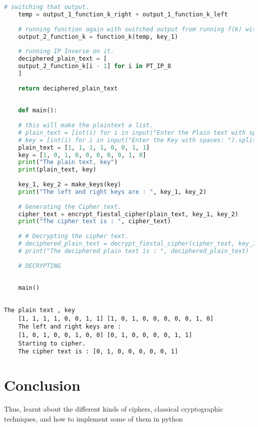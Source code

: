 \documentclass{article}
\begin{document}
\begin{lstlisting}[language=python, caption={Input Code}]
	# switching that output.
	temp = output_1_function_k_right + output_1_function_k_left
	
	# running function again with switched output from running f(k) with key 1
	output_2_function_k = function_k(temp, key_1)
	
	# running IP Inverse on it.
	deciphered_plain_text = [
	output_2_function_k[i - 1] for i in PT_IP_8
	]
	
	return deciphered_plain_text
	
	
	def main():
	
	# this will make the plaintext a list.
	# plain_text = [int(i) for i in input("Enter the Plain text with spaces: ").split()]
	# key = [int(i) for i in input("Enter the Key with spaces: ").split()]
	plain_text = [1, 1, 1, 1, 0, 0, 1, 1]
	key = [1, 0, 1, 0, 0, 0, 0, 0, 1, 0]
	print("The plain text, key")
	print(plain_text, key)
	
	key_1, key_2 = make_keys(key)
	print("The left and right keys are : ", key_1, key_2)
	
	# Generating the Cipher text.
	cipher_text = encrypt_fiestal_cipher(plain_text, key_1, key_2)
	print("The cipher text is : ", cipher_text)
	
	# # Decrypting the cipher text.
	# deciphered_plain_text = decrypt_fiestal_cipher(cipher_text, key_1, key_2)
	# print("The deciphered plain text is : ", deciphered_plain_text)
	
	# DECRYPTING
	
	
	main()
	
\end{lstlisting}
\begin{lstlisting}[caption={Output Result}]
	The plain text , key
	[1, 1, 1, 1, 0, 0, 1, 1] [1, 0, 1, 0, 0, 0, 0, 0, 1, 0]
	The left and right keys are : 
	[1, 0, 1, 0, 0, 1, 0, 0] [0, 1, 0, 0, 0, 0, 1, 1]
	Starting to cipher.
	The cipher text is : [0, 1, 0, 0, 0, 0, 0, 1]
\end{lstlisting}
\section{\textbf{Conclusion}}
Thus, learnt about the different kinds of ciphers, classical cryptographic techniques, and how to implement some of them in python
\end{document}
